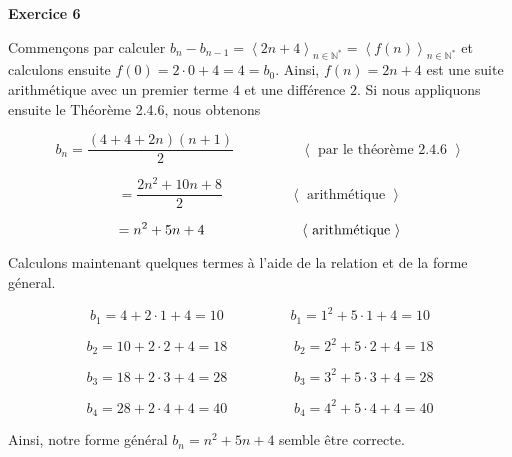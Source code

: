 \documentclass{article}
\newcommand{\tuple}[1]{\ensuremath{\left\langle #1 \right\rangle}}
\begin{document}
\textbf{Exercice 6}

\vspace{0.5cm}

Commençons par calculer $b_n - b_{n-1} = \tuple{2n + 4}_{n \in \mathbb{N}^{*}} = \tuple{f(n)}_{n \in \mathbb{N}^{*}}$ et calculons ensuite $f(0) = 2 \cdot 0 + 4 = 4 = b_0$. Ainsi, $f(n) = 2n + 4$ est une suite arithmétique avec un premier terme $4$ et une différence $2$. Si nous appliquons ensuite le Théorème 2.4.6, nous obtenons

\[
b_n = \frac{(4 + 4 + 2n)(n+1)}{2} \hspace{2cm} \tuple{ \text{ par le théorème 2.4.6 } }
\]

\[
= \frac{2n^2 + 10n + 8}{2} \hspace{2cm} \tuple{ \text{ arithmétique  }}
\]

\[
= n^2 + 5n + 4 \hspace{2.4cm} \tuple{ \text{ arithmétique }}
\]

Calculons maintenant quelques termes à l'aide de la relation et de la forme géneral. 

\[
b_1 = 4 + 2 \cdot 1 + 4 = 10  \hspace{2cm} b_1 = 1^2 + 5 \cdot 1 + 4 = 10
\]

\[
b_2 = 10 + 2 \cdot 2 + 4 = 18  \hspace{2cm} b_2 = 2^2 + 5 \cdot 2 + 4 = 18
\]

\[
b_3 = 18 + 2 \cdot 3 + 4 = 28  \hspace{2cm} b_3 = 3^2 + 5 \cdot 3 + 4 = 28
\]

\[
b_4 = 28 + 2 \cdot 4 + 4 = 40  \hspace{2cm} b_4 = 4^2 + 5 \cdot 4 + 4 = 40
\]

Ainsi, notre forme général $b_n = n^2 + 5n + 4$ semble être correcte.
\end{document}
